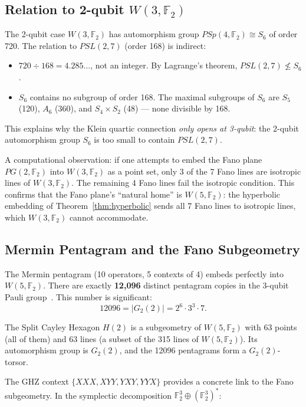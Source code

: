 \documentclass[11pt,a4paper]{article}
\theoremstyle{remark}
\newcommand{\F}{\mathbb{F}}
\begin{document}
\subsection{Relation to 2-qubit $W(3, \F_2)$}
\label{sec:2qubit-relation}

The 2-qubit case $W(3, \F_2)$ has automorphism group
$PSp(4, \F_2) \cong S_6$ of order 720. The relation to $PSL(2, 7)$
(order 168) is indirect:

\begin{itemize}
  \item $720 \div 168 = 4.285\ldots$, not an integer. By Lagrange's
    theorem, $PSL(2, 7) \not\leq S_6$.
  \item $S_6$ contains no subgroup of order 168. The maximal subgroups
    of $S_6$ are $S_5$ (120), $A_6$ (360), and $S_4 \times S_2$ (48) ---
    none divisible by 168.
\end{itemize}

This explains why the Klein quartic connection \emph{only opens at
3-qubit}: the 2-qubit automorphism group $S_6$ is too small to contain
$PSL(2, 7)$.

A computational observation: if one attempts to embed the Fano plane
$PG(2, \F_2)$ into $W(3, \F_2)$ as a point set, only 3 of the 7 Fano
lines are isotropic lines of $W(3, \F_2)$. The remaining 4 Fano lines
fail the isotropic condition. This confirms that the Fano plane's
``natural home'' is $W(5, \F_2)$: the hyperbolic embedding of
Theorem~\ref{thm:hyperbolic} sends all 7 Fano lines to isotropic lines,
which $W(3, \F_2)$ cannot accommodate.

\subsection{Mermin Pentagram and the Fano Subgeometry}
\label{sec:mermin-fano}

The Mermin pentagram (10 operators, 5 contexts of 4) embeds perfectly
into $W(5, \F_2)$. There are exactly \textbf{12{,}096} distinct
pentagram copies in the 3-qubit Pauli group~\cite{LevayPlanatSaniga}.
This number is significant:
\[
12096 = |G_2(2)| = 2^6 \cdot 3^3 \cdot 7.
\]

The Split Cayley Hexagon $H(2)$ is a subgeometry of $W(5, \F_2)$ with
63 points (all of them) and 63 lines (a subset of the 315 lines of
$W(5, \F_2)$). Its automorphism group is $G_2(2)$, and the 12096
pentagrams form a $G_2(2)$-torsor.

The GHZ context $\{XXX, XYY, YXY, YYX\}$ provides a concrete link to
the Fano subgeometry. In the symplectic decomposition
$\F_2^3 \oplus (\F_2^3)^*$:
\end{document}
